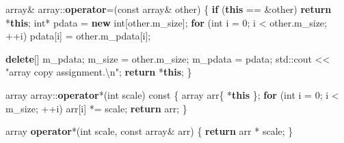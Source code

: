 \documentclass[
]{article}
\newenvironment{Shaded}{}{}
\newcommand{\AttributeTok}[1]{\textcolor[rgb]{0.49,0.56,0.16}{#1}}
\newcommand{\BuiltInTok}[1]{#1}
\newcommand{\ControlFlowTok}[1]{\textcolor[rgb]{0.00,0.44,0.13}{\textbf{#1}}}
\newcommand{\DataTypeTok}[1]{\textcolor[rgb]{0.56,0.13,0.00}{#1}}
\newcommand{\DecValTok}[1]{\textcolor[rgb]{0.25,0.63,0.44}{#1}}
\newcommand{\KeywordTok}[1]{\textcolor[rgb]{0.00,0.44,0.13}{\textbf{#1}}}
\newcommand{\NormalTok}[1]{#1}
\newcommand{\OperatorTok}[1]{\textcolor[rgb]{0.40,0.40,0.40}{#1}}
\newcommand{\SpecialCharTok}[1]{\textcolor[rgb]{0.25,0.44,0.63}{#1}}
\newcommand{\StringTok}[1]{\textcolor[rgb]{0.25,0.44,0.63}{#1}}
\newcommand{\VariableTok}[1]{\textcolor[rgb]{0.10,0.09,0.49}{#1}}
\begin{document}
\begin{Shaded}
\begin{Highlighting}[]
\NormalTok{array}\OperatorTok{\&}\NormalTok{ array}\OperatorTok{::}\KeywordTok{operator}\OperatorTok{=(}\AttributeTok{const}\NormalTok{ array}\OperatorTok{\&}\NormalTok{ other}\OperatorTok{)} \OperatorTok{\{}
    \ControlFlowTok{if} \OperatorTok{(}\KeywordTok{this} \OperatorTok{==} \OperatorTok{\&}\NormalTok{other}\OperatorTok{)}
        \ControlFlowTok{return} \OperatorTok{*}\KeywordTok{this}\OperatorTok{;}
    \DataTypeTok{int}\OperatorTok{*}\NormalTok{    pdata }\OperatorTok{=} \KeywordTok{new} \DataTypeTok{int}\OperatorTok{[}\NormalTok{other}\OperatorTok{.}\VariableTok{m\_size}\OperatorTok{];}
    \ControlFlowTok{for} \OperatorTok{(}\DataTypeTok{int}\NormalTok{ i }\OperatorTok{=} \DecValTok{0}\OperatorTok{;}\NormalTok{ i }\OperatorTok{\textless{}}\NormalTok{ other}\OperatorTok{.}\VariableTok{m\_size}\OperatorTok{;} \OperatorTok{++}\NormalTok{i}\OperatorTok{)}
\NormalTok{        pdata}\OperatorTok{[}\NormalTok{i}\OperatorTok{]} \OperatorTok{=}\NormalTok{ other}\OperatorTok{.}\VariableTok{m\_pdata}\OperatorTok{[}\NormalTok{i}\OperatorTok{];}

    \KeywordTok{delete}\OperatorTok{[]} \VariableTok{m\_pdata}\OperatorTok{;}
    \VariableTok{m\_size} \OperatorTok{=}\NormalTok{ other}\OperatorTok{.}\VariableTok{m\_size}\OperatorTok{;}
    \VariableTok{m\_pdata} \OperatorTok{=}\NormalTok{ pdata}\OperatorTok{;}
        \BuiltInTok{std::}\NormalTok{cout}\OperatorTok{ \textless{}\textless{}} \StringTok{"array copy assignment.}\SpecialCharTok{\textbackslash{}n}\StringTok{"}\OperatorTok{;}
        \ControlFlowTok{return} \OperatorTok{*}\KeywordTok{this}\OperatorTok{;}
\OperatorTok{\}}

\NormalTok{array array}\OperatorTok{::}\KeywordTok{operator}\OperatorTok{*(}\DataTypeTok{int}\NormalTok{ scale}\OperatorTok{)} \AttributeTok{const} \OperatorTok{\{}
\NormalTok{        array   arr}\OperatorTok{\{} \OperatorTok{*}\KeywordTok{this} \OperatorTok{\};}
        \ControlFlowTok{for} \OperatorTok{(}\DataTypeTok{int}\NormalTok{ i }\OperatorTok{=} \DecValTok{0}\OperatorTok{;}\NormalTok{ i }\OperatorTok{\textless{}} \VariableTok{m\_size}\OperatorTok{;} \OperatorTok{++}\NormalTok{i}\OperatorTok{)}
\NormalTok{                arr}\OperatorTok{[}\NormalTok{i}\OperatorTok{]} \OperatorTok{*=}\NormalTok{ scale}\OperatorTok{;}
        \ControlFlowTok{return}\NormalTok{ arr}\OperatorTok{;}
\OperatorTok{\}}

\NormalTok{array }\KeywordTok{operator}\OperatorTok{*(}\DataTypeTok{int}\NormalTok{ scale}\OperatorTok{,} \AttributeTok{const}\NormalTok{ array}\OperatorTok{\&}\NormalTok{ arr}\OperatorTok{)} \OperatorTok{\{}
        \ControlFlowTok{return}\NormalTok{ arr }\OperatorTok{*}\NormalTok{ scale}\OperatorTok{;}
\OperatorTok{\}}
\end{Highlighting}
\end{Shaded}
\end{document}
